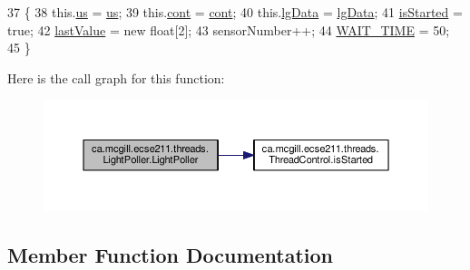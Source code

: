 \begin{DoxyCode}
37                                 \{
38     this.\hyperlink{classca_1_1mcgill_1_1ecse211_1_1threads_1_1_light_poller_ab6a9cb770bbf71f586697633db1475ff}{us} = \hyperlink{classca_1_1mcgill_1_1ecse211_1_1threads_1_1_light_poller_ab6a9cb770bbf71f586697633db1475ff}{us};
39     this.\hyperlink{classca_1_1mcgill_1_1ecse211_1_1threads_1_1_light_poller_ab6a9050ced4f6940add4735c8872194a}{cont} = \hyperlink{classca_1_1mcgill_1_1ecse211_1_1threads_1_1_light_poller_ab6a9050ced4f6940add4735c8872194a}{cont};
40     this.\hyperlink{classca_1_1mcgill_1_1ecse211_1_1threads_1_1_light_poller_a6cf53aecc3efc481f71d36341d2276c6}{lgData} = \hyperlink{classca_1_1mcgill_1_1ecse211_1_1threads_1_1_light_poller_a6cf53aecc3efc481f71d36341d2276c6}{lgData};
41     \hyperlink{classca_1_1mcgill_1_1ecse211_1_1threads_1_1_thread_control_a92f4933511db42476e39956246bcf2fe}{isStarted} = \textcolor{keyword}{true};
42     \hyperlink{classca_1_1mcgill_1_1ecse211_1_1threads_1_1_light_poller_a79908bf56395ae82ab5ac57b5b40f206}{lastValue} = \textcolor{keyword}{new} \textcolor{keywordtype}{float}[2];
43     sensorNumber++;
44     \hyperlink{classca_1_1mcgill_1_1ecse211_1_1threads_1_1_thread_control_a395cfe1d73b3ef14da0830ed0a499f82}{WAIT\_TIME} = 50;
45   \}
\end{DoxyCode}
Here is the call graph for this function\+:\nopagebreak
\begin{figure}[H]
\begin{center}
\leavevmode
\includegraphics[width=350pt]{classca_1_1mcgill_1_1ecse211_1_1threads_1_1_light_poller_adc07f842a1cc089195c5e47c2a0e5ee6_cgraph}
\end{center}
\end{figure}


\subsection{Member Function Documentation}
\mbox{\label{classca_1_1mcgill_1_1ecse211_1_1threads_1_1_light_poller_aab90a460a4d0c926fb8f3930492a8fb1}} 
